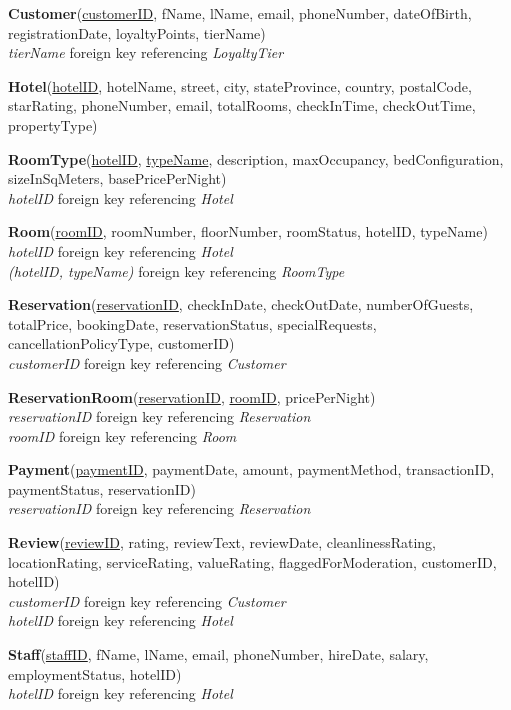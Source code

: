 \documentclass[12pt,letterpaper]{article}
\begin{document}
\textbf{Customer}(\underline{customerID}, fName, lName, email, phoneNumber, dateOfBirth, registrationDate, loyaltyPoints, tierName)\\
\textit{tierName} foreign key referencing \textit{LoyaltyTier}

\textbf{Hotel}(\underline{hotelID}, hotelName, street, city, stateProvince, country, postalCode, starRating, phoneNumber, email, totalRooms, checkInTime, checkOutTime, propertyType)

\textbf{RoomType}(\underline{hotelID}, \underline{typeName}, description, maxOccupancy, bedConfiguration, sizeInSqMeters, basePricePerNight)\\
\textit{hotelID} foreign key referencing \textit{Hotel}

\textbf{Room}(\underline{roomID}, roomNumber, floorNumber, roomStatus, hotelID, typeName)\\
\textit{hotelID} foreign key referencing \textit{Hotel}\\
\textit{(hotelID, typeName)} foreign key referencing \textit{RoomType}

\textbf{Reservation}(\underline{reservationID}, checkInDate, checkOutDate, numberOfGuests, totalPrice, bookingDate, reservationStatus, specialRequests, cancellationPolicyType, customerID)\\
\textit{customerID} foreign key referencing \textit{Customer}

\textbf{ReservationRoom}(\underline{reservationID}, \underline{roomID}, pricePerNight)\\
\textit{reservationID} foreign key referencing \textit{Reservation}\\
\textit{roomID} foreign key referencing \textit{Room}

\textbf{Payment}(\underline{paymentID}, paymentDate, amount, paymentMethod, transactionID, paymentStatus, reservationID)\\
\textit{reservationID} foreign key referencing \textit{Reservation}

\textbf{Review}(\underline{reviewID}, rating, reviewText, reviewDate, cleanlinessRating, locationRating, serviceRating, valueRating, flaggedForModeration, customerID, hotelID)\\
\textit{customerID} foreign key referencing \textit{Customer}\\
\textit{hotelID} foreign key referencing \textit{Hotel}

\textbf{Staff}(\underline{staffID}, fName, lName, email, phoneNumber, hireDate, salary, employmentStatus, hotelID)\\
\textit{hotelID} foreign key referencing \textit{Hotel}
\end{document}
